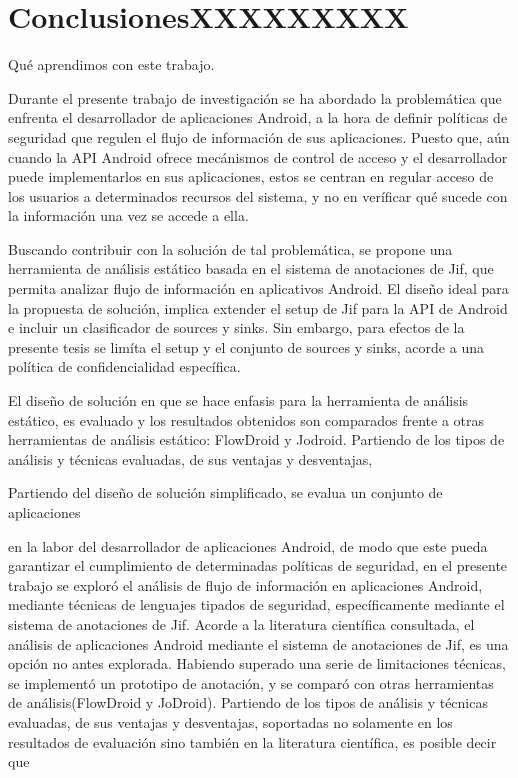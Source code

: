 \section{ConclusionesXXXXXXXXX}
Qué aprendimos con este trabajo.\newline

Durante el presente trabajo de investigación se ha abordado la problemática que
enfrenta el desarrollador de aplicaciones Android, a la hora de definir políticas de
seguridad que regulen el flujo de información de sus aplicaciones. Puesto que,
aún cuando la API Android ofrece mecánismos de control de acceso y el
desarrollador puede implementarlos en sus aplicaciones, estos se centran en
regular acceso de los usuarios a determinados recursos del sistema, y no en
veríficar qué sucede con la información una vez se accede a ella.

Buscando contribuir con la solución de tal problemática, se propone una
herramienta de análisis estático basada en el sistema de anotaciones de Jif, que
permita analizar flujo de información en aplicativos Android. El diseño ideal
para la propuesta de solución, implica extender el setup de Jif para la API de
Android e incluir un clasificador de sources y sinks. Sin embargo, para efectos
de la presente tesis se limíta el setup y el conjunto de sources y sinks, acorde
a una política de confidencialidad específica.

El diseño de solución en que se hace enfasis para la herramienta de análisis
estático, es evaluado y los resultados obtenidos son comparados frente a otras
herramientas de análisis estático: FlowDroid y Jodroid. Partiendo de los tipos
de análisis y técnicas evaluadas, de sus ventajas y desventajas, 



Partiendo del diseño de solución simplificado, se evalua un conjunto de
aplicaciones



en la labor del desarrollador de aplicaciones Android, de
modo que este pueda garantizar el cumplimiento de determinadas políticas de
seguridad, en el presente trabajo se exploró el análisis de flujo de información
en aplicaciones Android, mediante técnicas de lenguajes tipados de seguridad,
específicamente mediante el sistema de anotaciones de Jif.\newline 
Acorde a la literatura científica consultada, el análisis de aplicaciones
Android mediante el sistema de anotaciones de Jif, es una opción no antes
explorada.\newline
Habiendo superado una serie de limitaciones técnicas, se implementó un
prototipo de anotación, y se comparó con otras herramientas de
análisis(FlowDroid y JoDroid).
Partiendo de los tipos de análisis y técnicas evaluadas, de sus ventajas y
desventajas, soportadas no solamente en los resultados de evaluación sino
también en la literatura científica, es posible decir que 



